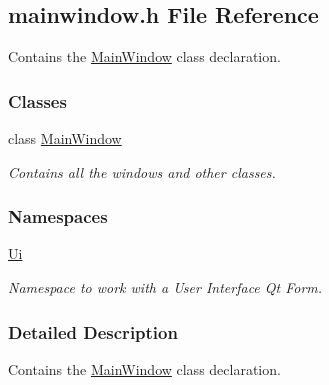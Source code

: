 \hypertarget{a00018}{}\subsection{mainwindow.\+h File Reference}
\label{a00018}


Contains the \hyperlink{a00005}{Main\+Window} class declaration.  


\subsubsection*{Classes}
\begin{DoxyCompactItemize}
\item 
class \hyperlink{a00005}{Main\+Window}
\begin{DoxyCompactList}\small\item\em Contains all the windows and other classes. \end{DoxyCompactList}\end{DoxyCompactItemize}
\subsubsection*{Namespaces}
\begin{DoxyCompactItemize}
\item 
 \hyperlink{a00027}{Ui}
\begin{DoxyCompactList}\small\item\em Namespace to work with a User Interface Qt Form. \end{DoxyCompactList}\end{DoxyCompactItemize}


\subsubsection{Detailed Description}
Contains the \hyperlink{a00005}{Main\+Window} class declaration. 

